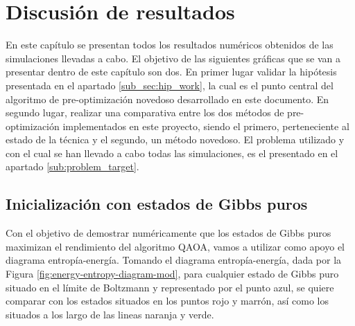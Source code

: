 \chapter{Discusión de resultados}
\label{chapter:results}

En este capítulo se presentan todos los resultados numéricos obtenidos de las simulaciones llevadas a cabo. El objetivo de las siguientes gráficas que se van a presentar dentro de este capítulo son dos. En primer lugar validar la hipótesis presentada en el apartado \ref{sub_sec:hip_work}, la cual es el punto central del algoritmo de pre-optimización novedoso desarrollado en este documento. En segundo lugar, realizar una comparativa entre los dos métodos de pre-optimización implementados en este proyecto, siendo el primero, perteneciente al estado de la técnica y el segundo, un método novedoso. El problema utilizado y con el cual se han llevado a cabo todas las simulaciones, es el presentado en el apartado \ref{sub:problem_target}.

\section{Inicialización con estados de Gibbs puros}
\label{sub_sec:result_gibbs_states}

Con el objetivo de demostrar numéricamente que los estados de Gibbs puros maximizan el rendimiento del algoritmo QAOA, vamos a utilizar como apoyo el diagrama entropía-energía. Tomando el diagrama entropía-energía, dada por la Figura \ref{fig:energy-entropy-diagram-mod}, para cualquier estado de Gibbs puro situado en el límite de Boltzmann y representado por el punto azul, se quiere comparar con los estados situados en los puntos rojo y marrón, así como los situados a los largo de las lineas naranja y verde.


